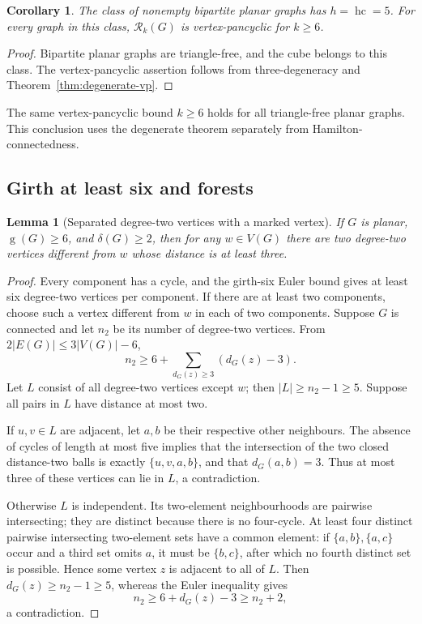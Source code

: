\documentclass[11pt]{article}
\newtheorem{lemma}[theorem]{Lemma}
\newtheorem{corollary}[theorem]{Corollary}
\theoremstyle{remark}
\newcommand{\Rk}{\mathcal R_k}
\newcommand{\hc}{\operatorname{hc}}
\newcommand{\girth}{\operatorname{g}}
\numberwithin{equation}{section}
\numberwithin{table}{section}
\begin{document}
\begin{corollary}
The class of nonempty bipartite planar graphs has $h=\hc=5$.
For every graph in this class, $\Rk(G)$ is vertex-pancyclic for
$k\ge6$.
\end{corollary}

\begin{proof}
Bipartite planar graphs are triangle-free, and the cube belongs to this
class.  The vertex-pancyclic assertion follows from three-degeneracy and
Theorem~\ref{thm:degenerate-vp}.
\end{proof}

The same vertex-pancyclic bound $k\ge6$ holds for all triangle-free
planar graphs.  This conclusion uses the degenerate theorem separately
from Hamilton-connectedness.

\subsection{Girth at least six and forests}

\begin{lemma}[Separated degree-two vertices with a marked vertex]
\label{lem:marked-two}
If $G$ is planar, $\girth(G)\ge6$, and $\delta(G)\ge2$, then for
any $w\in V(G)$ there are two degree-two vertices different from
$w$ whose distance is at least three.
\end{lemma}

\begin{proof}
Every component has a cycle, and the girth-six Euler bound gives at
least six degree-two vertices per component.  If there are at least two
components, choose such a vertex different from $w$ in each of two
components.  Suppose $G$ is connected and let $n_2$ be its number of
degree-two vertices.  From $2|E(G)|\le3|V(G)|-6$,
\[
 n_2\ge6+\sum_{d_G(z)\ge3}(d_G(z)-3).
\]
Let $L$ consist of all degree-two vertices except $w$; then
$|L|\ge n_2-1\ge5$.  Suppose all pairs in $L$ have distance at
most two.

If $u,v\in L$ are adjacent, let $a,b$ be their respective other
neighbours.  The absence of cycles of length at most five implies that
the intersection of the two closed distance-two balls is exactly
$\{u,v,a,b\}$, and that $d_G(a,b)=3$.  Thus at most three of
these vertices can lie in $L$, a contradiction.

Otherwise $L$ is independent.  Its two-element neighbourhoods are
pairwise intersecting; they are distinct because there is no four-cycle.
At least four distinct pairwise intersecting two-element sets have a
common element: if $\{a,b\},\{a,c\}$ occur and a third set omits
$a$, it must be $\{b,c\}$, after which no fourth distinct set is
possible.  Hence some vertex $z$ is adjacent to all of $L$.
Then $d_G(z)\ge n_2-1\ge5$, whereas the Euler inequality gives
\[
 n_2\ge6+d_G(z)-3\ge n_2+2,
\]
a contradiction.
\end{proof}
\end{document}

